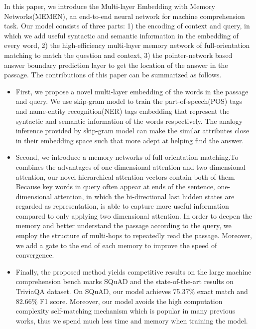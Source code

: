 \documentclass[letterpaper]{article}
\begin{document}
In this paper, we introduce the Multi-layer Embedding with Memory Networks(MEMEN), an end-to-end neural network for machine comprehension task. Our model consists of three parts: 1) the encoding of context and query, in which we add useful syntactic  and semantic information in the embedding of every word, 2) the high-efficiency multi-layer memory network of full-orientation matching to match the question and context, 3) the pointer-network based answer boundary prediction layer to get the location of the answer in the passage. The contributions of this paper can be summarized as follows.

\begin{itemize}
\item First, we propose a novel multi-layer embedding of the words in the passage and query. We use skip-gram model to train the part-of-speech(POS) tags and name-entity recognition(NER) tags embedding that represent the syntactic and semantic information of the words respectively. The analogy inference provided by  skip-gram model can make the similar attributes close in their embedding space such that more adept at helping find the answer.

\item Second, we introduce a memory networks of full-orientation matching.To combines the advantages of one dimensional attention and two dimensional attention, our novel hierarchical attention vectors contain both of them. Because key words in query often appear at ends of the sentence, one-dimensional attention, in which the bi-directional last hidden states are regarded as representation, is able to capture more useful information compared to only applying two dimensional attention. In order to deepen the memory and  better understand the passage according to the query, we employ the structure of multi-hops to repeatedly read the passage. Moreover, we add a gate to the end of each memory to improve the speed of convergence.

\item Finally, the proposed method yields competitive results on the large machine comprehension bench marks SQuAD and the state-of-the-art results on TriviaQA dataset. On SQuAD, our model achieves 75.37\% exact match and 82.66\% F1 score. Moreover, our model avoids the high computation complexity self-matching mechanism which is popular in many previous works, thus we spend much less time and memory when training the model. 

\end{itemize}
\end{document}
